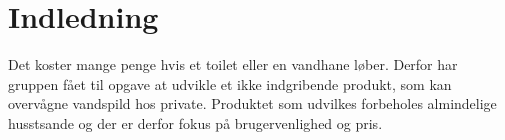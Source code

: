 \section{Indledning}
Det koster mange penge hvis et toilet eller en vandhane løber. Derfor har gruppen fået til opgave at udvikle et ikke indgribende produkt, som kan overvågne vandspild hos private. Produktet som udvilkes forbeholes almindelige husstsande og der er derfor fokus på brugervenlighed og pris.

